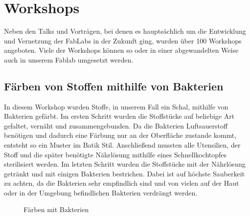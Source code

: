\documentclass{\basedir/fablab-document}
\begin{document}
\section*{Workshops}

Neben den Talks und Vorträgen, bei denen es hauptsächlich um die
Entwicklung und Vernetzung der FabLabs in der Zukunft ging, wurden über
100 Workshops angeboten. Viele der Workshops können so oder in einer
abgewandelten Weise auch in unserem Fablab umgesetzt werden.

\subsection*{Färben von Stoffen mithilfe von Bakterien}

In diesem Workshop wurden Stoffe, in unserem Fall ein Schal, mithilfe von Bakterien gefärbt. Im ersten Schritt wurden die Stoffstücke auf beliebige Art gefaltet, vernäht und zusammengebunden. Da die Bakterien Luftsauerstoff benötigen und dadurch eine Färbung nur an der Oberfläche zustande kommt, entsteht so ein Muster im Batik Stil. Anschließend mussten alle Utensilien, der Stoff und die später benötigte Nährlösung mithilfe eines Schnellkochtopfes sterilisiert werden. Im letzten Schritt wurden die Stoffstücke mit der Nährlösung getränkt und mit einigen Bakterien bestrichen. Dabei ist auf höchste Sauberkeit zu achten, da die Bakterien sehr empfindlich sind und von vielen auf der Haut oder in der Umgebung befindlichen Bakterien verdrängt werden.

\begin{figure}[h]
	\noindent{}
	\caption{Färben mit Bakterien}
	\label{faerben-von-stoffen-mithilfe-von-bakterien}
\end{figure}
\end{document}
